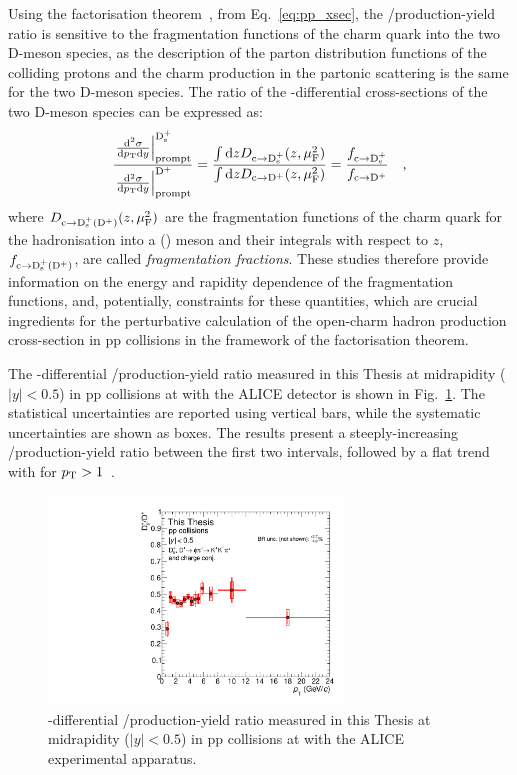 Using the factorisation theorem~\cite{Collins:1989gx}, from Eq.~\ref{eq:pp_xsec}, the \ds/\dpl production-yield ratio is sensitive to the fragmentation functions of the charm quark into the two D-meson species, as the description of the parton distribution functions of the colliding protons and the charm production in the partonic scattering is the same for the two D-meson species. The ratio of the \pt-differential cross-sections of the two D-meson species can be expressed as:
\begin{equation*}
    \frac{\left.\frac{\mathrm{d}^2\sigma}{\mathrm{d}p_\mathrm{T}\mathrm{d} y}\right\vert^\mathrm{D_s^+}_\mathrm{prompt}}{\left.\frac{\mathrm{d}^2\sigma}{\mathrm{d}p_\mathrm{T}\mathrm{d} y}\right\vert^\mathrm{D^+}_\mathrm{prompt}} = \frac{\int \mathrm{d} z D_\mathrm{c\rightarrow \mathrm{D_s^+}}(z,\mu_\mathrm{F}^2)}{\int \mathrm{d} z D_\mathrm{c\rightarrow \mathrm{D^+}}(z,\mu_\mathrm{F}^2)} = \frac{f_\mathrm{c\rightarrow\mathrm{D_s^+}}}{f_\mathrm{c\rightarrow\mathrm{D^+}}}\quad ,
\end{equation*}
where $D_\mathrm{c\rightarrow \mathrm{D_s^+} (\mathrm{D^+})}(z,\mu_\mathrm{F}^2)$ are the fragmentation functions of the charm quark for the hadronisation into a \ds (\dpl) meson and their integrals with respect to $z$, $f_\mathrm{c\rightarrow\mathrm{D_s^+}(\mathrm{D^+})}$, are called \emph{fragmentation fractions}. These studies therefore provide information on the energy and rapidity dependence of the fragmentation functions, and, potentially, constraints for these quantities, which are crucial ingredients for the perturbative calculation of the open-charm hadron production cross-section in pp collisions in the framework of the factorisation theorem. 

The \pt-differential \ds/\dpl production-yield ratio measured in this Thesis at midrapidity \mbox{($\lvert y\rvert<0.5$)} in pp collisions at \thirteen with the ALICE detector is shown in Fig.~\ref{fig:dsdplratio}. The statistical uncertainties are reported using vertical bars, while the systematic uncertainties are shown as boxes. The results present a steeply-increasing \ds/\dpl production-yield ratio between the first two \pt intervals, followed by a flat trend with \pt for $p_\mathrm{T}>1$~\gevc. 


\begin{figure}[tb]
    \centering
    \includegraphics[width=0.7\textwidth]{Figures/Chapter 7/DsOverDplus.pdf}
    \caption{\pt-differential \ds/\dpl production-yield ratio measured in this Thesis at midrapidity ($\lvert y\rvert<0.5$) in pp collisions at \thirteen with the ALICE experimental apparatus.}
    \label{fig:dsdplratio}
\end{figure}

